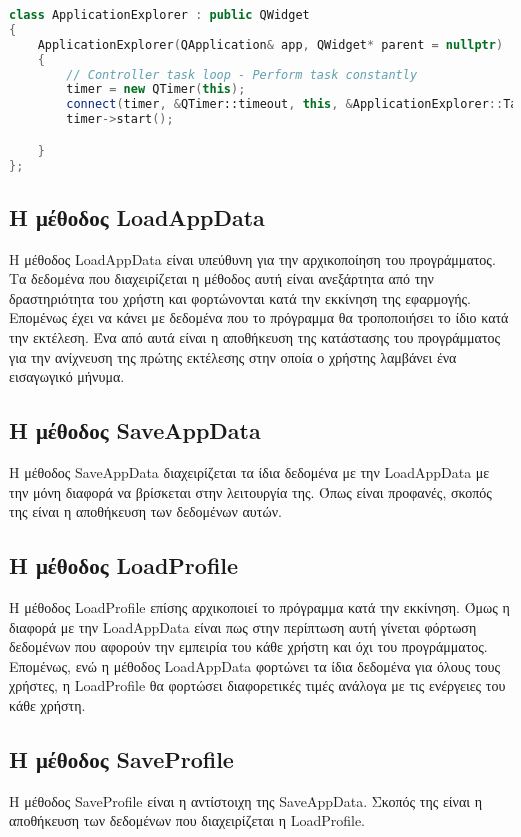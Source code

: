 \begin{lstlisting}[language=C++, style=cppstyle]
class ApplicationExplorer : public QWidget
{
    ApplicationExplorer(QApplication& app, QWidget* parent = nullptr) : QWidget(parent), app(app)
    {
        // Controller task loop - Perform task constantly
        timer = new QTimer(this);
        connect(timer, &QTimer::timeout, this, &ApplicationExplorer::TaskGamepadNavigation);
        timer->start();

    }
};
\end{lstlisting}



\subsection{Η μέθοδος LoadAppData}
Η μέθοδος LoadAppData είναι υπεύθυνη για την αρχικοποίηση του προγράμματος. Τα
δεδομένα που διαχειρίζεται η μέθοδος αυτή είναι ανεξάρτητα από την δραστηριότητα
του χρήστη και φορτώνονται κατά την εκκίνηση της εφαρμογής. Επομένως έχει να 
κάνει με δεδομένα που το πρόγραμμα θα τροποποιήσει το ίδιο κατά την εκτέλεση. 
Ένα από αυτά είναι η αποθήκευση της κατάστασης του προγράμματος για την ανίχνευση 
της πρώτης εκτέλεσης στην οποία ο χρήστης λαμβάνει ένα εισαγωγικό μήνυμα.



\subsection{Η μέθοδος SaveAppData}
Η μέθοδος SaveAppData διαχειρίζεται τα ίδια δεδομένα με την LoadAppData με την μόνη
διαφορά να βρίσκεται στην λειτουργία της. Όπως είναι προφανές, σκοπός της είναι η
αποθήκευση των δεδομένων αυτών.

\subsection{Η μέθοδος LoadProfile}
Η μέθοδος LoadProfile επίσης αρχικοποιεί το πρόγραμμα κατά την εκκίνηση. Όμως η διαφορά
με την LoadAppData είναι πως στην περίπτωση αυτή γίνεται φόρτωση δεδομένων που αφορούν
την εμπειρία του κάθε χρήστη και όχι του προγράμματος. Επομένως, ενώ η μέθοδος LoadAppData
φορτώνει τα ίδια δεδομένα για όλους τους χρήστες, η LoadProfile θα φορτώσει διαφορετικές
τιμές ανάλογα με τις ενέργειες του κάθε χρήστη.

\subsection{Η μέθοδος SaveProfile}
Η μέθοδος SaveProfile είναι η αντίστοιχη της SaveAppData. Σκοπός της είναι η αποθήκευση
των δεδομένων που διαχειρίζεται η LoadProfile.


